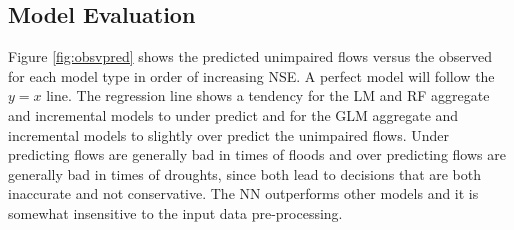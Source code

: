 \subsection{Model Evaluation}
Figure \ref{fig:obsvpred} shows the predicted unimpaired flows versus the observed for each model type in order of increasing NSE. A perfect model will follow the $y=x$ line. The regression line shows a tendency for the LM and RF aggregate and incremental models to under predict and for the GLM aggregate and incremental models to slightly over predict the unimpaired flows. Under predicting flows are generally bad in times of floods and over predicting flows are generally bad in times of droughts, since both lead to decisions that are both inaccurate and not conservative. The NN outperforms other models and it is somewhat insensitive to the input data pre-processing.


